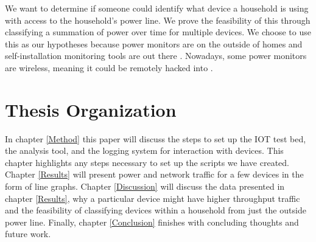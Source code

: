 We want to determine if someone could identify what device a household is using with access to the household's power line. We prove the feasibility of this through classifying a summation of power over time for multiple devices. We choose to use this as our hypotheses because power monitors are on the outside of homes and self-installation monitoring tools are out there \cite{griffith_2017}. Nowadays, some power monitors are wireless, meaning it could be remotely hacked into \cite{griffith_2017}.

\section{Thesis Organization}
In chapter \ref{Method} this paper will discuss the steps to set up the IOT test bed, the analysis tool, and the logging system for interaction with devices. This chapter highlights any steps necessary to set up the scripts we have created. Chapter \ref{Results} will present power and network traffic for a few devices in the form of line graphs. Chapter \ref{Discussion} will discuss the data presented in chapter \ref{Results}, why a particular device might have higher throughput traffic and the feasibility of classifying devices within a household from just the outside power line. Finally, chapter \ref{Conclusion} finishes with concluding thoughts and future work.